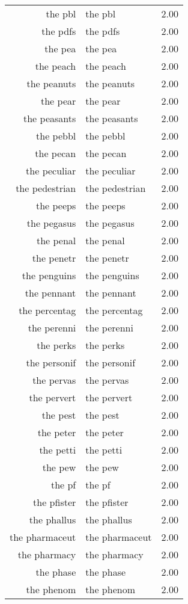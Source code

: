 \begin{table}[ht]
\begin{tabular}{rlr}
  the pbl & the pbl & 2.00 \\ 
  the pdfs & the pdfs & 2.00 \\ 
  the pea & the pea & 2.00 \\ 
  the peach & the peach & 2.00 \\ 
  the peanuts & the peanuts & 2.00 \\ 
  the pear & the pear & 2.00 \\ 
  the peasants & the peasants & 2.00 \\ 
  the pebbl & the pebbl & 2.00 \\ 
  the pecan & the pecan & 2.00 \\ 
  the peculiar & the peculiar & 2.00 \\ 
  the pedestrian & the pedestrian & 2.00 \\ 
  the peeps & the peeps & 2.00 \\ 
  the pegasus & the pegasus & 2.00 \\ 
  the penal & the penal & 2.00 \\ 
  the penetr & the penetr & 2.00 \\ 
  the penguins & the penguins & 2.00 \\ 
  the pennant & the pennant & 2.00 \\ 
  the percentag & the percentag & 2.00 \\ 
  the perenni & the perenni & 2.00 \\ 
  the perks & the perks & 2.00 \\ 
  the personif & the personif & 2.00 \\ 
  the pervas & the pervas & 2.00 \\ 
  the pervert & the pervert & 2.00 \\ 
  the pest & the pest & 2.00 \\ 
  the peter & the peter & 2.00 \\ 
  the petti & the petti & 2.00 \\ 
  the pew & the pew & 2.00 \\ 
  the pf & the pf & 2.00 \\ 
  the pfister & the pfister & 2.00 \\ 
  the phallus & the phallus & 2.00 \\ 
  the pharmaceut & the pharmaceut & 2.00 \\ 
  the pharmacy & the pharmacy & 2.00 \\ 
  the phase & the phase & 2.00 \\ 
  the phenom & the phenom & 2.00 \\ 

\end{tabular}
\end{table}
